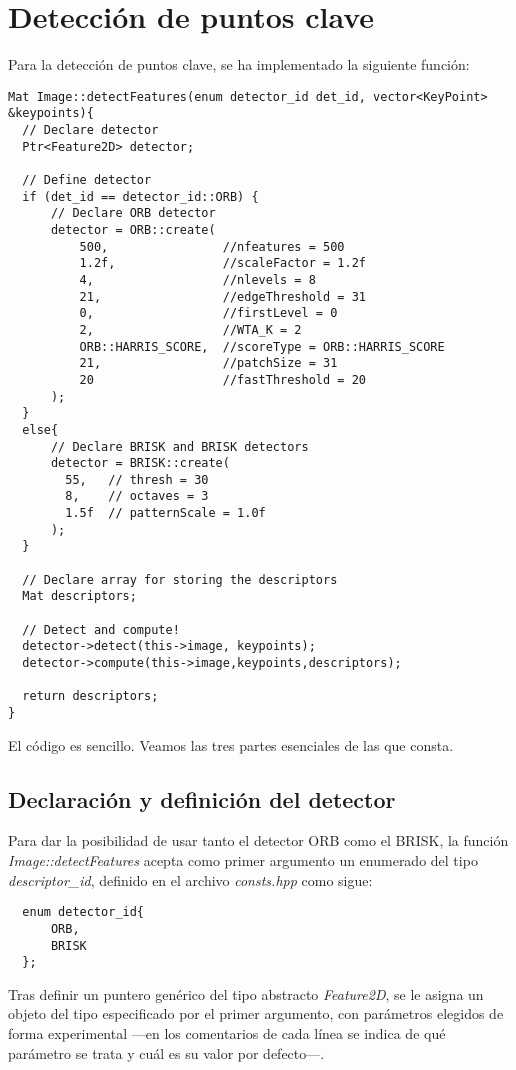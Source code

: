 \documentclass[a4paper, 11pt]{article}
\theoremstyle{definition}
\theoremstyle{theorem}
\begin{document}
  \section{Detección de puntos clave}
  Para la detección de puntos clave, se ha implementado la siguiente función:
  \begin{lstlisting}
Mat Image::detectFeatures(enum detector_id det_id, vector<KeyPoint> &keypoints){
  // Declare detector
  Ptr<Feature2D> detector;

  // Define detector
  if (det_id == detector_id::ORB) {
      // Declare ORB detector
      detector = ORB::create(
          500,                //nfeatures = 500
          1.2f,               //scaleFactor = 1.2f
          4,                  //nlevels = 8
          21,                 //edgeThreshold = 31
          0,                  //firstLevel = 0
          2,                  //WTA_K = 2
          ORB::HARRIS_SCORE,  //scoreType = ORB::HARRIS_SCORE
          21,                 //patchSize = 31
          20                  //fastThreshold = 20
      );
  }
  else{
      // Declare BRISK and BRISK detectors
      detector = BRISK::create(
        55,   // thresh = 30
        8,    // octaves = 3
        1.5f  // patternScale = 1.0f
      );
  }

  // Declare array for storing the descriptors
  Mat descriptors;

  // Detect and compute!
  detector->detect(this->image, keypoints);
  detector->compute(this->image,keypoints,descriptors);

  return descriptors;
}
  \end{lstlisting}

  El código es sencillo. Veamos las tres partes esenciales de las que consta.

  \subsection{Declaración y definición del detector}
  Para dar la posibilidad de usar tanto el detector ORB como el BRISK, la función \emph{Image::detectFeatures} acepta como primer argumento un enumerado del tipo \emph{descriptor\_id}, definido en el archivo \emph{consts.hpp} como sigue:
  \begin{lstlisting}
  enum detector_id{
      ORB,
      BRISK
  };
  \end{lstlisting}

  Tras definir un puntero genérico del tipo abstracto \emph{Feature2D}, se le asigna un objeto del tipo especificado por el primer argumento, con parámetros elegidos de forma experimental ---en los comentarios de cada línea se indica de qué parámetro se trata y cuál es su valor por defecto---.
\end{document}
